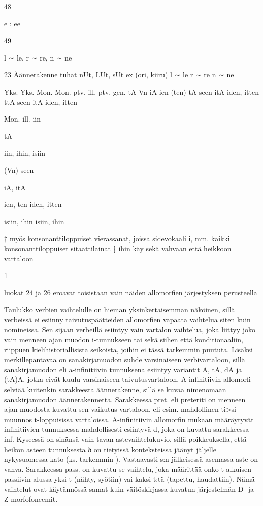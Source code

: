\documentclass[free]{flammie}
\begin{document}
\begin{table}
48

e : ee

49

l ∼ le,
r ∼ re,
n ∼ ne

23
Äännerakenne
tuhat
nUt, LUt,
sUt
ex
(ori,
kiiru)
l ∼ le
r ∼ re
n ∼ ne

Yks. Yks. Mon. Mon.
ptv. ill.
ptv.
gen.
tA
Vn
iA
ien
(ten)
tA
seen itA
iden,
itten
ttA
seen itA
iden,
itten

Mon.
ill.
iin

tA

iin,
ihin,
isiin

(Vn)
seen

iA,
itA

ien, ten
iden,
itten

isiin,
ihin
isiin,
ihin

† myös konsonanttiloppuiset vierassanat, joissa sidevokaali i, mm. kaikki
konsonanttiloppuiset sitaattilainat
‡ ihin käy sekä vahvaan että heikkoon vartaloon

1

luokat 24 ja 26 eroavat toisistaan vain näiden allomorfien järjestyksen perusteella
\end{table}

Taulukko verbien vaihtelulle on hieman yksinkertaisemman näköinen, sillä verbeissä ei esiinny taivutuspäätteiden allomorfien vapaata vaihtelua siten kuin nomineissa. Sen sijaan verbeillä esiintyy vain vartalon vaihtelua, joka liittyy joko
vain menneen ajan muodon i-tunnukseen tai sekä siihen että konditionaaliin, riippuen kielihistoriallisista seikoista, joihin ei tässä tarkemmin puututa. Lisäksi merkillepantavaa on sanakirjamuodon suhde varsinaiseen verbivartaloon, sillä sanakirjamuodon eli a-infinitiivin tunnuksena esiintyy variantit A, tA, dA ja (tA)A, jotka eivät kuulu varsinaiseen taivutusvartaloon. A-infinitiivin allomorfi selviää kuitenkin sarakkeesta äännerakenne, sillä se kuvaa nimenomaan sanakirjamuodon
äännerakennetta. Sarakkeessa pret. eli preteriti on menneen ajan muodosta kuvattu sen vaikutus vartaloon, eli esim. mahdollinen ti>si-muunnos t-loppuisissa
vartaloissa. A-infinitiivin allomorfin mukaan määräytyvät infinitiivien tunnuksessa mahdollisesti esiintyvä d, joka on kuvattu sarakkeessa inf. Kyseessä on sinänsä
vain tavan astevaihtelukuvio, sillä poikkeuksella, että heikon asteen tunnuksesta
ð on tietyissä konteksteissa jäänyt jäljelle nykysuomessa kato (ks. tarkemmin
\cite{hakulinen1970suomen}). Vastaavasti s:n jälkeisessä asemassa aste on vahva. Sarakkeessa
pass. on kuvattu se vaihtelu, joka määrittää onko t-alkuisen passiivin alussa yksi
t (nähty, syötiin) vai kaksi t:tä (tapettu, haudattiin). Nämä vaihtelut ovat käytännössä samat kuin väitöskirjassa \cite{koskenniemi1983twolevel} kuvatun järjestelmän D- ja
Z-morfofoneemit.
\end{document}
